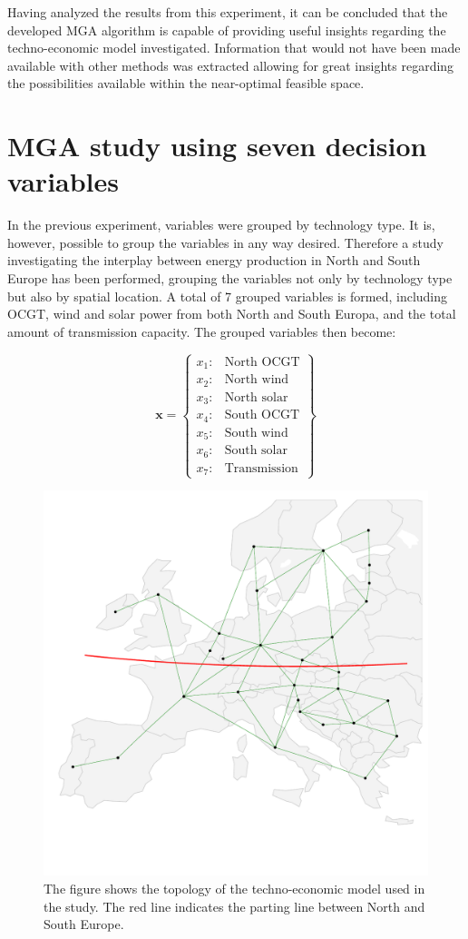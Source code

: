Having analyzed the results from this experiment, it can be concluded that the developed MGA algorithm is capable of providing useful insights regarding the techno-economic model investigated. Information that would not have been made available with other methods was extracted allowing for great insights regarding the possibilities available within the near-optimal feasible space. 

\section{MGA study using seven decision variables}\label{sec:7D}
In the previous experiment, variables were grouped by technology type. It is, however, possible to group the variables in any way desired. Therefore a study investigating the interplay between energy production in North and South Europe has been performed, grouping the variables not only by technology type but also by spatial location. A total of 7 grouped variables is formed, including OCGT, wind and solar power from both North and South Europa, and the total amount of transmission capacity. The grouped variables then become: 

\begin{equation*}
\mathbf{x} = 
\begin{Bmatrix}
x_1:& \text{North OCGT} \\
x_2:& \text{North wind} \\
x_3:& \text{North solar} \\
x_4:& \text{South OCGT} \\
x_5:& \text{South wind} \\
x_6:& \text{South solar} \\
x_7:& \text{Transmission} 
\end{Bmatrix}
\end{equation*}

\begin{figure}[h]\centering
	\includegraphics[width=.7\textwidth,trim={0 3cm 0 0cm},clip]{./Images/7D_study_topology}
	\caption{The figure shows the topology of the techno-economic model used in the study. The red line indicates the parting line between North and South Europe. }
	\label{fig:7d_topology}
\end{figure}


